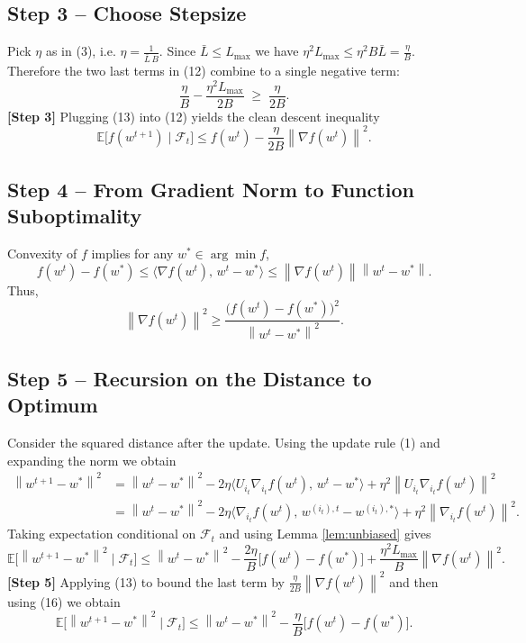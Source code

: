 \documentclass{article}
\newcommand{\E}{\mathbb{E}}
\newcommand{\norm}[1]{\left\lVert#1\right\rVert}
\begin{document}
\subsection*{Step 3 – Choose Stepsize}
Pick $\eta$ as in (3), i.e. $\eta=\frac{1}{\bar L\,B}$.
Since $\bar L\le L_{\max}$ we have $\eta^{2}L_{\max}\le\eta^{2}B\bar L =\frac{\eta}{B}$.
Therefore the two last terms in (12) combine to a single negative term:
\[
\frac{\eta}{B}-\frac{\eta^{2}L_{\max}}{2B}
\;\ge\;\frac{\eta}{2B}.
\tag{13}
\]
\textbf{[Step 3]} Plugging (13) into (12) yields the clean descent inequality
\[
\E\!\bigl[f(w^{t+1})\mid\mathcal{F}_{t}\bigr]
\le f(w^{t})-\frac{\eta}{2B}\norm{\nabla f(w^{t})}^{2}.
\tag{14}
\]

\subsection*{Step 4 – From Gradient Norm to Function Suboptimality}
Convexity of $f$ implies for any $w^{*}\in\arg\min f$,
\[
f(w^{t})-f(w^{*})\le\langle\nabla f(w^{t}),\,w^{t}-w^{*}\rangle
\le\norm{\nabla f(w^{t})}\norm{w^{t}-w^{*}}.
\tag{15}
\]
Thus,
\[
\norm{\nabla f(w^{t})}^{2}
\ge\frac{\bigl(f(w^{t})-f(w^{*})\bigr)^{2}}{\norm{w^{t}-w^{*}}^{2}}.
\tag{16}
\]

\subsection*{Step 5 – Recursion on the Distance to Optimum}
Consider the squared distance after the update.
Using the update rule (1) and expanding the norm we obtain
\[
\begin{aligned}
\norm{w^{t+1}-w^{*}}^{2}
&=\norm{w^{t}-w^{*}}^{2}
-2\eta\langle U_{i_{t}}\nabla_{i_{t}}f(w^{t}),\,w^{t}-w^{*}\rangle
+\eta^{2}\norm{U_{i_{t}}\nabla_{i_{t}}f(w^{t})}^{2}\\
&=\norm{w^{t}-w^{*}}^{2}
-2\eta\langle \nabla_{i_{t}}f(w^{t}),\,w^{(i_{t}),t}-w^{(i_{t}),*}\rangle
+\eta^{2}\norm{\nabla_{i_{t}}f(w^{t})}^{2}.
\end{aligned}
\tag{17}
\]
Taking expectation conditional on $\mathcal{F}_{t}$ and using Lemma \ref{lem:unbiased}
gives
\[
\E\!\bigl[\norm{w^{t+1}-w^{*}}^{2}\mid\mathcal{F}_{t}\bigr]
\le \norm{w^{t}-w^{*}}^{2}
- \frac{2\eta}{B}\bigl[f(w^{t})-f(w^{*})\bigr]
+\frac{\eta^{2}L_{\max}}{B}\norm{\nabla f(w^{t})}^{2}.
\tag{18}
\]
\textbf{[Step 5]} Applying (13) to bound the last term by $\frac{\eta}{2B}\norm{\nabla f(w^{t})}^{2}$ and then using (16) we obtain
\[
\E\!\bigl[\norm{w^{t+1}-w^{*}}^{2}\mid\mathcal{F}_{t}\bigr]
\le \norm{w^{t}-w^{*}}^{2}
-\frac{\eta}{B}\bigl[f(w^{t})-f(w^{*})\bigr].
\tag{19}
\]
\end{document}
